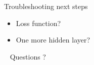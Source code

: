 \documentclass[bigger]{beamer}
\begin{document}
\begin{frame}[label={sec:org10f1340}]{Troubleshooting next steps}
\begin{itemize}
\item Loss function?
\item One more hidden layer?
\end{itemize}
\end{frame}
\begin{frame}[label={sec:orgb7e4b92},standout]{~}
Questions ?
\end{frame}
\end{document}
